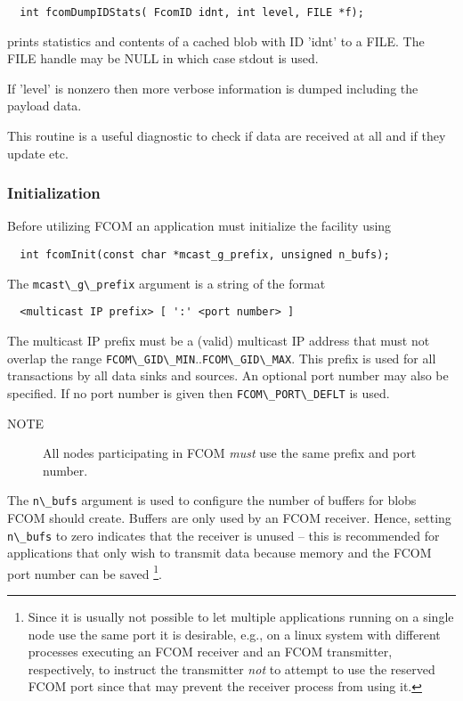 \documentclass[11pt]{article}
\newcommand{\fcom}{FCOM}
\newcommand{\blob}{blob}
\newcommand{\cstl}[1]{{\lstinline+#1+}}
\newcommand{\note}[1]{
	\begin{description}
		\item[NOTE] #1
	\end{description}
}
\begin{document}
      \begin{verbatim}
  int fcomDumpIDStats( FcomID idnt, int level, FILE *f);
      \end{verbatim}

	  prints statistics and contents of a cached \blob{} with
      ID 'idnt' to a FILE. The FILE handle may be NULL in
      which case stdout is used. 

	  If 'level' is nonzero then more verbose information
      is dumped including the payload data.

	  This routine is a useful diagnostic to check if data are received
      at all and if they update etc.

    \subsubsection{Initialization}
      Before utilizing \fcom{} an application must initialize
      the facility using
      \begin{verbatim}
  int fcomInit(const char *mcast_g_prefix, unsigned n_bufs);
      \end{verbatim}
      The \cstl{mcast\_g\_prefix} argument is a string of
      the format
      \begin{verbatim}
  <multicast IP prefix> [ ':' <port number> ]
      \end{verbatim}
      The multicast IP prefix must be a (valid) multicast
      IP address that must not overlap the range
      \cstl{FCOM\_GID\_MIN}..\cstl{FCOM\_GID\_MAX}. This
      prefix is used for all transactions by all data
      sinks and sources. An optional port number may
      also be specified. If no port number is given then
      \cstl{FCOM\_PORT\_DEFLT} is used.

      \note{All nodes participating in \fcom{} {\em must} use the
      same prefix and port number.}

      The \cstl{n\_bufs} argument is used to configure the
      number of buffers for \blob{}s \fcom{} should create.
      Buffers are only used by an \fcom{} receiver. Hence,
      setting \cstl{n\_bufs} to zero indicates that the
      receiver is unused -- this is recommended for applications
      that only wish to transmit data because memory and
      the \fcom{} port number can be saved%
\footnote{Since it is usually not possible to let multiple
applications running on a single node use the same port it
is desirable, e.g., on a linux system with different
processes executing an \fcom{} receiver and an \fcom{}
transmitter, respectively, to instruct the transmitter
{\em not} to attempt to use the reserved \fcom{} port since
that may prevent the receiver process from using it.}.
\end{document}
